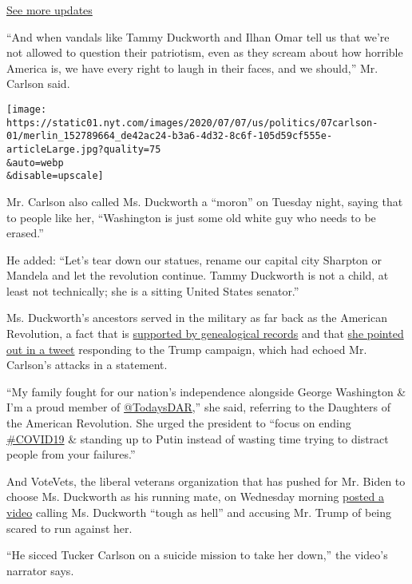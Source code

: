 \href{https://www.nytimes.com/2020/07/31/us/elections/biden-vs-trump.html?action=click\&pgtype=Article\&state=default\&region=MAIN_CONTENT_1\&context=storylines_live_updates}{See
more updates}

``And when vandals like Tammy Duckworth and Ilhan Omar tell us that
we're not allowed to question their patriotism, even as they scream
about how horrible America is, we have every right to laugh in their
faces, and we should,'' Mr. Carlson said.

\texttt{[image: https://static01.nyt.com/images/2020/07/07/us/politics/07carlson-01/merlin\_152789664\_de42ac24-b3a6-4d32-8c6f-105d59cf555e-articleLarge.jpg?quality=75\\\&auto=webp\\\&disable=upscale]}

Mr. Carlson also called Ms. Duckworth a ``moron'' on Tuesday night,
saying that to people like her, ``Washington is just some old white guy
who needs to be erased.''

He added: ``Let's tear down our statues, rename our capital city
Sharpton or Mandela and let the revolution continue. Tammy Duckworth is
not a child, at least not technically; she is a sitting United States
senator.''

Ms. Duckworth's ancestors served in the military as far back as the
American Revolution, a fact that is
\href{https://www.propublica.org/article/the-dig-tammy-duckworths-family-has-served-in-the-military-for-centuries}{supported
by genealogical records} and that
\href{https://twitter.com/TammyforIL/status/1280595475079598085}{she
pointed out in a tweet} responding to the Trump campaign, which had
echoed Mr. Carlson's attacks in a statement.

``My family fought for our nation's independence alongside George
Washington \& I'm a proud member of
\href{https://twitter.com/TodaysDAR}{@TodaysDAR},'' she said, referring
to the Daughters of the American Revolution. She urged the president to
``focus on ending
\href{https://twitter.com/hashtag/COVID19?src=hashtag_click}{\#COVID19}
\& standing up to Putin instead of wasting time trying to distract
people from your failures.''

And VoteVets, the liberal veterans organization that has pushed for Mr.
Biden to choose Ms. Duckworth as his running mate, on Wednesday morning
\href{https://www.youtube.com/watch?v=Rml8P9pXmXw}{posted a video}
calling Ms. Duckworth ``tough as hell'' and accusing Mr. Trump of being
scared to run against her.

``He sicced Tucker Carlson on a suicide mission to take her down,'' the
video's narrator says.

